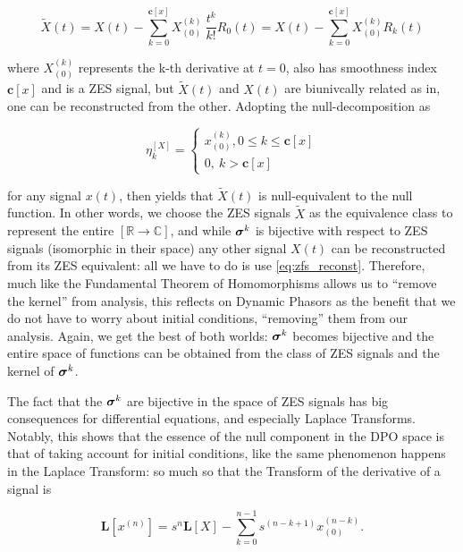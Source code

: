 \begin{equation} \tilde{X}(t) = X(t) - \sum_{k=0}^{\mathbf{c}\left[x\right]} X^{(k)}_{(0)}\ \dfrac{t^k}{k!}R_0(t) = X(t) - \sum_{k=0}^{\mathbf{c}\left[x\right]} X^{(k)}_{(0)} R_k(t) \label{eq:zfs_reconst}\end{equation}

	\noindent where $X^{(k)}_{(0)}$ represents the k-th derivative at $t=0$, also has smoothness index $\mathbf{c}\left[x\right]$ and is a ZES signal, but $\tilde{X}(t)$ and $X(t)$ are biunivcally related as in, one can be reconstructed from the other. Adopting the null-decomposition as

\begin{equation} \eta_k^{\left[X\right]} = \left\{\begin{array}{l} x^{(k)}_{(0)}, 0\leq k \leq \mathbf{c}\left[x\right] \\[3mm] 0,\ k > \mathbf{c}\left[x\right] \end{array}\right.\end{equation}

	\noindent for any signal $x(t)$, then yields that $\tilde{X}(t)$ is null-equivalent to the null function. In other words, we choose the ZES signals $\tilde{X}$ as the equivalence class to represent the entire $\left[\mathbb{R}\to\mathbb{C}\right]$, and while $\boldsymbol{\sigma}^{k}$ is bijective with respect to ZES signals (isomorphic in their space) any other signal $X(t)$ can be reconstructed from its ZES equivalent: all we have to do is use \eqref{eq:zfs_reconst}. Therefore, much like the Fundamental Theorem of Homomorphisms allows us to ``remove the kernel'' from analysis, this reflects on Dynamic Phasors as the benefit that we do not have to worry about initial conditions, ``removing'' them from our analysis. Again, we get the best of both worlds: $\boldsymbol{\sigma}^{k}$ becomes bijective and the entire space of functions can be obtained from the class of ZES signals and the kernel of $\boldsymbol{\sigma}^{k}$.

	The fact that the $\boldsymbol{\sigma}^{k}$ are bijective in the space of ZES signals has big consequences for differential equations, and especially Laplace Transforms. Notably, this shows that the essence of the null component in the DPO space is that of taking account for initial conditions, like the same phenomenon happens in the Laplace Transform: so much so that the Transform of the derivative of a signal is

\begin{equation} \mathbf{L}\left[x^{(n)}\right] = s^n\mathbf{L}\left[X\right] - \sum_{k=0}^{n-1} s^{(n-k+1)}x_{(0)}^{(n-k)} .\label{eq:laplace_initial_conds}\end{equation}

